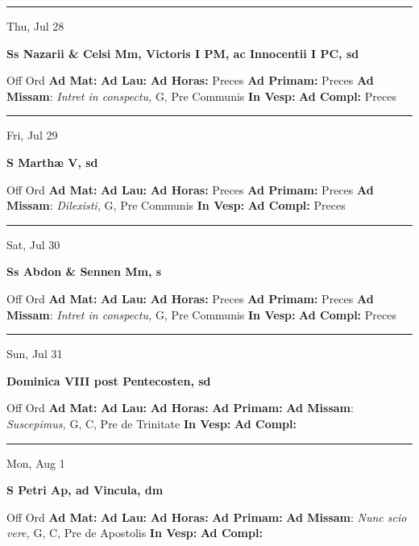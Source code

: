 \documentclass[letterpaper, 10pt]{article}
\begin{document}
\hrule
\begin{center}
Thu, Jul 28
\end{center}\textbf{ \large Ss Nazarii \& Celsi Mm, Victoris I PM, ac Innocentii I PC, \textnormal{\normalsize sd}}
\begin{justify}
Off Ord
\textbf{Ad Mat: }
\textbf{Ad Lau: }
\textbf{Ad Horas: }Preces
\textbf{Ad Primam: }Preces
\textbf{Ad Missam}: \textit{Intret in conspectu,} G, Pre Communis
\textbf{In Vesp: }
\textbf{Ad Compl: }Preces\end{justify}



\hrule
\begin{center}
Fri, Jul 29
\end{center}\textbf{ \large S Marthæ V, \textnormal{\normalsize sd}}
\begin{justify}
Off Ord
\textbf{Ad Mat: }
\textbf{Ad Lau: }
\textbf{Ad Horas: }Preces
\textbf{Ad Primam: }Preces
\textbf{Ad Missam}: \textit{Dilexisti,} G, Pre Communis
\textbf{In Vesp: }
\textbf{Ad Compl: }Preces\end{justify}



\hrule
\begin{center}
Sat, Jul 30
\end{center}\textbf{ \large Ss Abdon \& Sennen Mm, \textnormal{\normalsize s}}
\begin{justify}
Off Ord
\textbf{Ad Mat: }
\textbf{Ad Lau: }
\textbf{Ad Horas: }Preces
\textbf{Ad Primam: }Preces
\textbf{Ad Missam}: \textit{Intret in conspectu,} G, Pre Communis
\textbf{In Vesp: }
\textbf{Ad Compl: }Preces\end{justify}



\hrule
\begin{center}
Sun, Jul 31
\end{center}\textbf{ \large Dominica VIII post Pentecosten, \textnormal{\normalsize sd}}
\begin{justify}
Off Ord
\textbf{Ad Mat: }
\textbf{Ad Lau: }
\textbf{Ad Horas: }
\textbf{Ad Primam: }
\textbf{Ad Missam}: \textit{Suscepimus,} G, C, Pre de Trinitate
\textbf{In Vesp: }
\textbf{Ad Compl: }\end{justify}



\hrule
\begin{center}
Mon, Aug 1
\end{center}\textbf{ \large S Petri Ap, ad Vincula, \textnormal{\normalsize dm}}
\begin{justify}
Off Ord
\textbf{Ad Mat: }
\textbf{Ad Lau: }
\textbf{Ad Horas: }
\textbf{Ad Primam: }
\textbf{Ad Missam}: \textit{Nunc scio vere,} G, C, Pre de Apostolis
\textbf{In Vesp: }
\textbf{Ad Compl: }\end{justify}
\end{document}
